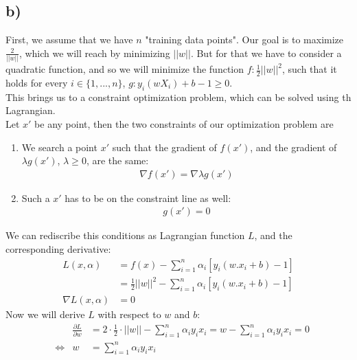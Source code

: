 \documentclass[a4paper]{article}
\begin{document}
    \subsection*{b)}
        First, we assume that we have $n$ "training data points".
        Our goal is to maximize $\frac{2}{||w||}$, which we will reach by minimizing $||w||$.
        But for that we have to consider a quadratic function, and so we will minimize the function $f: \frac{1}{2} ||w||^2$, 
        such that it holds for every $i \in \{1,...,n\}$, $g: y_i (w X_i) +b -1 \geq 0$.\\
        This brings us to a constraint optimization problem, which can be solved using th Lagrangian.\\
        Let $x'$ be any point, then the two constraints of our optimization problem are
        \begin{enumerate}
            \item We search a point $x'$ such that the gradient of $f(x')$, and the gradient of $\lambda g(x')$, $\lambda \geq 0$, are the same:
                \begin{align}
                    \nabla f(x') = \nabla \lambda g(x')
                \end{align}
            \item Such a $x'$ has to be on the constraint line as well:
                \begin{align}
                    g(x') = 0
                \end{align}
        \end{enumerate}
        We can rediscribe this conditions as Lagrangian function $L$, and the corresponding derivative:
        \begin{align}
            L(x, \alpha) &= f(x) - \sum\limits_{i=1}^n \alpha_i [y_i (w.x_i + b) - 1]\\
            &= \frac{1}{2} ||w||^2 - \sum\limits_{i=1}^n \alpha_i [y_i (w.x_i + b) - 1]\\
            \nabla L(x,\alpha) &= 0
        \end{align}
        Now we will derive $L$ with respect to $w$ and $b$:
        \begin{align}
            & & \frac{\partial L}{\partial w} &= 2 \cdot \frac{1}{2} \cdot ||w|| - \sum\limits_{i=1}^n \alpha_i y_i x_i = w - \sum\limits_{i=1}^n \alpha_i y_i x_i = 0\\
            &\Leftrightarrow & w &= \sum\limits_{i=1}^n \alpha_i y_i x_i
        \end{align}
\end{document}
